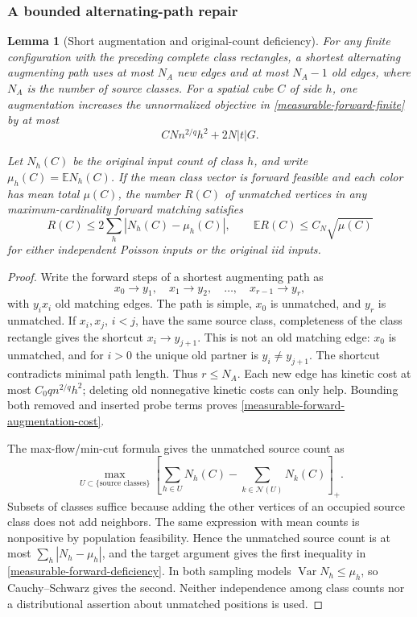 \documentclass[11pt,reqno]{amsart}
\newtheorem{lemma}[theorem]{Lemma}
\theoremstyle{definition}
\theoremstyle{remark}
\numberwithin{equation}{section}
\newcommand{\E}{\mathbb E}
\begin{document}
\subsubsection{A bounded alternating-path repair}

\begin{lemma}[Short augmentation and original-count deficiency]
\label{measurable-forward-augmentation}
For any finite configuration with the preceding complete class rectangles,
a shortest alternating augmenting path uses at most \(N_A\) new edges and
at most \(N_A-1\) old edges, where \(N_A\) is the number of source classes.
For a spatial cube \(C\) of side \(h\), one augmentation increases the
unnormalized objective in \eqref{measurable-forward-finite} by at most
\begin{equation}
\label{measurable-forward-augmentation-cost}
              C N n^{2/q}h^2+2N|t|G.
\end{equation}

Let \(N_h(C)\) be the original input count of class \(h\), and write
\(\mu_h(C)=\E N_h(C)\). If the mean class vector is forward feasible
and each color has mean total \(\mu(C)\), the number \(R(C)\) of
unmatched vertices in any maximum-cardinality forward matching satisfies
\begin{equation}
\label{measurable-forward-deficiency}
 R(C)\le2\sum_h|N_h(C)-\mu_h(C)|,\qquad
 \E R(C)\le C_N\sqrt{\mu(C)}
\end{equation}
for either independent Poisson inputs or the original iid inputs.
\end{lemma}
\begin{proof}
Write the forward steps of a shortest augmenting path as
\[
 x_0\to y_1,\quad x_1\to y_2,\quad\ldots,\quad x_{r-1}\to y_r,
\]
with \(y_i x_i\) old matching edges. The path is simple, \(x_0\)
is unmatched, and \(y_r\) is unmatched. If \(x_i,x_j\), \(i<j\),
have the same source class, completeness of the class rectangle gives
the shortcut \(x_i\to y_{j+1}\). This is not an old matching edge:
\(x_0\) is unmatched, and for \(i>0\) the unique old partner is
\(y_i\ne y_{j+1}\). The shortcut contradicts minimal path length.
Thus \(r\le N_A\). Each new edge has kinetic cost at most
\(C_0q n^{2/q}h^2\); deleting old nonnegative kinetic costs can only
help. Bounding both removed and inserted probe terms proves
\eqref{measurable-forward-augmentation-cost}.

The max-flow/min-cut formula gives the unmatched source count as
\[
 \max_{U\subset\{\text{source classes}\}}
 \left[\sum_{h\in U}N_h(C)
      -\sum_{k\in\mathcal N(U)}N_k(C)\right]_+ .
\]
Subsets of classes suffice because adding the other vertices of an
occupied source class does not add neighbors. The same expression
with mean counts is nonpositive by population feasibility. Hence the
unmatched source count is at most \(\sum_h|N_h-\mu_h|\), and the
target argument gives the first inequality in
\eqref{measurable-forward-deficiency}. In both sampling models
\(\operatorname{Var}N_h\le\mu_h\), so Cauchy--Schwarz gives the second.
Neither independence among class counts nor a distributional assertion
about unmatched positions is used.
\end{proof}
\end{document}

